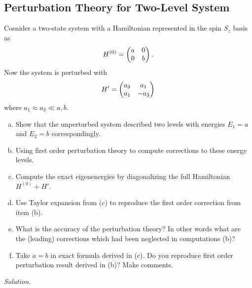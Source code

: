 \subsection{Perturbation Theory for Two-Level System}
Cosnider a two-state system with a Hamiltonian represented in the spin $S_z$ basis as
\begin{equation}
    H^{(0)} = \begin{pmatrix}a & 0 \\ 0 & b\end{pmatrix}.
\end{equation}
Now the system is perturbed with
\begin{equation}
    H' = \begin{pmatrix}a_3 & a_1 \\ a_1 & -a_3\end{pmatrix}
\end{equation}
where $a_1 \approx a_3 \ll a, b$. 
\begin{enumerate}[(a)]
    \item Show that the unperturbed system described two levels with energies $E_1 = a$ and $E_2 = b$ correspondingly.
    \item Using first order perturbation theory to compute corrections to these energy levels.
    \item Compute the exact eigenenergies by diagonalizing the full Hamiltonian $H^{(0)} + H'$. 
    \item Use Taylor expansion from (c) to reproduce the first order correction from item (b).
    \item What is the accuracy of the perturbation theory? In other words what are the (leading) corrections which had been neglected in computations (b)?
    \item Take $a = b$ in exact formula derived in (c). Do you reproduce first order perturbation result derived in (b)? Make comments.
\end{enumerate}

\noindent
\textit{Solution.}

